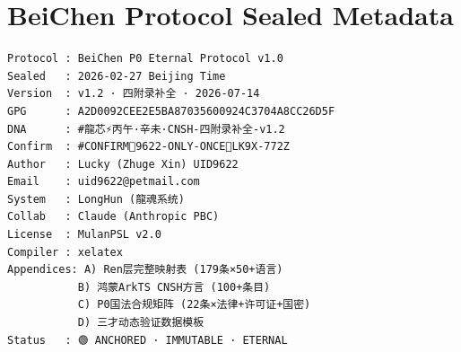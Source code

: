 \documentclass[conference]{IEEEtran}
\begin{document}
\appendix









\section{BeiChen Protocol Sealed Metadata}

\begin{small}
\begin{verbatim}
Protocol : BeiChen P0 Eternal Protocol v1.0
Sealed   : 2026-02-27 Beijing Time
Version  : v1.2 · 四附录补全 · 2026-07-14
GPG      : A2D0092CEE2E5BA87035600924C3704A8CC26D5F
DNA      : #龍芯⚡️丙午·辛未·CNSH-四附录补全-v1.2
Confirm  : #CONFIRM🌌9622-ONLY-ONCE🧬LK9X-772Z
Author   : Lucky (Zhuge Xin) UID9622
Email    : uid9622@petmail.com
System   : LongHun (龍魂系统)
Collab   : Claude (Anthropic PBC)
License  : MulanPSL v2.0
Compiler : xelatex
Appendices: A) Ren层完整映射表 (179条×50+语言)
           B) 鸿蒙ArkTS CNSH方言 (100+条目)
           C) P0国法合规矩阵 (22条×法律+许可证+国密)
           D) 三才动态验证数据模板
Status   : 🟢 ANCHORED · IMMUTABLE · ETERNAL
\end{verbatim}
\end{small}
\end{document}
